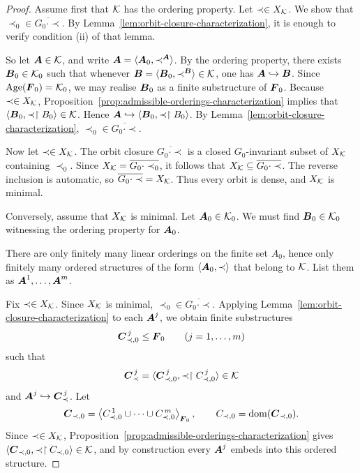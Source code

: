 \begin{proof}
    Assume first that \(\mathcal{K}\) has the ordering property. Let \(\prec\in X_{\mathcal{K}}\).
    We show that \(\prec_0\in\overline{G_0\cdot \prec}\).
    By Lemma~\ref{lem:orbit-closure-characterization}, it is enough to verify condition (ii) of that lemma.

    So let \(\boldsymbol{A}\in\mathcal{K}\), and write
    \(\boldsymbol{A}=\langle \boldsymbol{A}_0,\prec^{\boldsymbol{A}}\rangle\).
    By the ordering property, there exists \(\boldsymbol{B}_0\in\mathcal{K}_0\)
    such that whenever
    \(\boldsymbol{B}=\langle \boldsymbol{B}_0,\prec^{\boldsymbol{B}}\rangle\in\mathcal{K}\), one has
    \(\boldsymbol{A}\hookrightarrow \boldsymbol{B}\). Since \(\operatorname{Age}(\boldsymbol{F}_0)=\mathcal{K}_0\),
    we may realise \(\boldsymbol{B}_0\) as a finite substructure of \(\boldsymbol{F}_0\). Because \(\prec\in X_{\mathcal{K}}\), Proposition~\ref{prop:admissible-orderings-characterization} implies that
    \(\langle \boldsymbol{B}_0,\prec\restriction B_0\rangle\in\mathcal{K}\).
    Hence
    \(\boldsymbol{A}\hookrightarrow \langle \boldsymbol{B}_0,\prec\restriction B_0\rangle\).
    By Lemma~\ref{lem:orbit-closure-characterization},
    \(\prec_0\in\overline{G_0\cdot \prec}\).

    Now let \(\prec\in X_{\mathcal{K}}\).
    The orbit closure \(\overline{G_0\cdot \prec}\) is a closed \(G_0\)-invariant subset of \(X_{\mathcal{K}}\) containing \(\prec_0\). Since
    \(X_{\mathcal{K}}=\overline{G_0\cdot \prec_0}\),
    it follows that
    \(X_{\mathcal{K}}\subseteq \overline{G_0\cdot \prec}\).
    The reverse inclusion is automatic, so
    \(\overline{G_0\cdot \prec}=X_{\mathcal{K}}\).
    Thus every orbit is dense, and \(X_{\mathcal{K}}\) is minimal.

    Conversely, assume that \(X_{\mathcal{K}}\) is minimal. Let \(\boldsymbol{A}_0\in\mathcal{K}_0\).
    We must find \(\boldsymbol{B}_0\in\mathcal{K}_0\)
    witnessing the ordering property for \(\boldsymbol{A}_0\).

    There are only finitely many linear orderings on the finite set \(A_0\), hence only finitely many ordered structures of the form
    \(\langle \boldsymbol{A}_0,\prec\rangle\) that belong to \(\mathcal{K}\). List them as
    \(\boldsymbol{A}^1,\dots,\boldsymbol{A}^m\).

    Fix \(\prec\in X_{\mathcal{K}}\).
    Since \(X_{\mathcal{K}}\) is minimal,
    \(\prec_0\in\overline{G_0\cdot \prec}\).
    Applying Lemma~\ref{lem:orbit-closure-characterization} to each \(\boldsymbol{A}^j\), we obtain finite substructures
    \[
        \boldsymbol{C}^{\,j}_{\prec,0}\leq \boldsymbol{F}_0
        \qquad (j=1,\dots,m)
    \]
    such that
    \[
        \boldsymbol{C}^{\,j}_{\prec}
        =
        \langle \boldsymbol{C}^{\,j}_{\prec,0},\prec\restriction C^{\,j}_{\prec,0}\rangle\in\mathcal{K}
    \]
    and \(\boldsymbol{A}^j\hookrightarrow \boldsymbol{C}^{\,j}_{\prec}\). Let
    \[
        \boldsymbol{C}_{\prec,0}
        =
        \left\langle
            C^{\,1}_{\prec,0}\cup\cdots\cup C^{\,m}_{\prec,0}
        \right\rangle_{\boldsymbol{F}_0},
        \qquad
        C_{\prec,0}=\operatorname{dom}(\boldsymbol{C}_{\prec,0}).
    \]
    Since \(\prec\in X_{\mathcal{K}}\), Proposition~\ref{prop:admissible-orderings-characterization} gives
    \(\langle \boldsymbol{C}_{\prec,0},\prec\restriction C_{\prec,0}\rangle\in\mathcal{K}\),
    and by construction every \(\boldsymbol{A}^j\) embeds into this ordered structure.


\end{proof}
